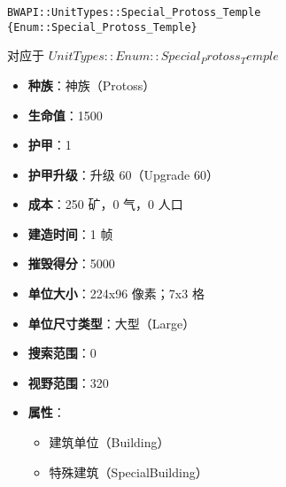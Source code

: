 \begin{tcolorbox}[colback=white, colframe=black!60!white, title=Special\_Protoss\_Temple(), arc=0mm]
    \begin{verbatim}
BWAPI::UnitTypes::Special_Protoss_Temple {Enum::Special_Protoss_Temple}
    \end{verbatim}
    对应于  $ UnitTypes::Enum::Special_Protoss_Temple $ 
    \begin{itemize}
        \item \textbf{种族}：神族（Protoss）
        \item \textbf{生命值}：1500
        \item \textbf{护甲}：1
        \item \textbf{护甲升级}：升级 60（Upgrade 60）
        \item \textbf{成本}：250 矿，0 气，0 人口
        \item \textbf{建造时间}：1 帧
        \item \textbf{摧毁得分}：5000
        \item \textbf{单位大小}：224x96 像素；7x3 格
        \item \textbf{单位尺寸类型}：大型（Large）
        \item \textbf{搜索范围}：0
        \item \textbf{视野范围}：320
        \item \textbf{属性}：
            \begin{itemize}
                \item 建筑单位（Building）
                \item 特殊建筑（SpecialBuilding）
            \end{itemize}
    \end{itemize}
\end{tcolorbox}

